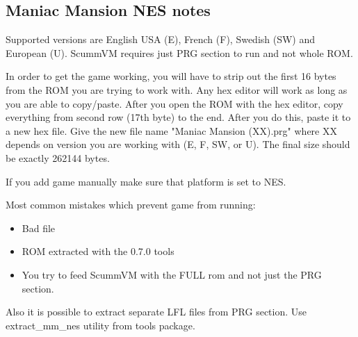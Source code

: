 \subsection{Maniac Mansion NES notes}
Supported versions are English USA (E), French (F), Swedish (SW) and 
European (U). ScummVM requires just PRG section to run and not whole ROM.

In order to get the game working, you will have to strip out the first
16 bytes from the ROM you are trying to work with. Any hex editor will work 
as long as you are able to copy/paste.  After you open the ROM with the 
hex editor, copy everything from second row (17th byte) to the end. After
you do this, paste it to a new hex file. Give the new file name 
"Maniac Mansion (XX).prg" where XX depends on version you are  working 
with (E, F, SW, or U).  The final size should be exactly 262144 bytes.

If you add game manually make sure that platform is set to NES.

Most common mistakes which prevent game from running:

\begin{itemize}
  \item Bad file
  \item ROM extracted with the 0.7.0 tools
  \item You try to feed ScummVM with the FULL rom and not just the PRG section.
\end{itemize}

Also it is possible to extract separate LFL files from PRG section. Use
extract\_mm\_nes utility from tools package.
